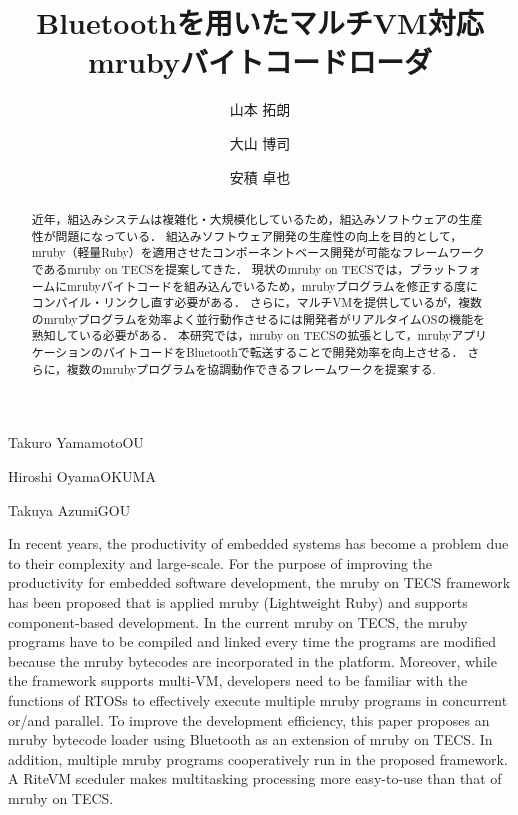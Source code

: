 \documentclass[submit,techrep]{ipsj}
\begin{document}
\title{Bluetoothを用いたマルチVM対応\\mrubyバイトコードローダ}





\author{山本 拓朗}{Takuro Yamamoto}{OU}%
\author{大山 博司}{Hiroshi Oyama}{OKUMA}%
\author{安積 卓也}{Takuya Azumi}{GOU}%

\begin{abstract}
近年，組込みシステムは複雑化・大規模化しているため，組込みソフトウェアの生産性が問題になっている．
組込みソフトウェア開発の生産性の向上を目的として，mruby（軽量Ruby）を適用させたコンポーネントベース開発が可能なフレームワークであるmruby on TECSを提案してきた．
現状のmruby on TECSでは，プラットフォームにmrubyバイトコードを組み込んでいるため，mrubyプログラムを修正する度にコンパイル・リンクし直す必要がある．
さらに，マルチVMを提供しているが，複数のmrubyプログラムを効率よく並行動作させるには開発者がリアルタイムOSの機能を熟知している必要がある．
本研究では，mruby on TECSの拡張として，mrubyアプリケーションのバイトコードをBluetoothで転送することで開発効率を向上させる．
さらに，複数のmrubyプログラムを協調動作できるフレームワークを提案する.

\end{abstract}


\begin{eabstract}
In recent years, the productivity of embedded systems has become a problem due to their complexity and large-scale.
For the purpose of improving the productivity for embedded software development, the mruby on TECS framework has been proposed that is applied mruby (Lightweight Ruby) and supports component-based development.
In the current mruby on TECS, the mruby programs have to be compiled and linked every time the programs are modified because the mruby bytecodes are incorporated in the platform.
Moreover, while the framework supports multi-VM, developers need to be familiar with the functions of RTOSs to effectively execute multiple mruby programs in concurrent or/and parallel.
To improve the development efficiency, this paper proposes an mruby bytecode loader using Bluetooth as an extension of mruby on TECS.
In addition, multiple mruby programs cooperatively run in the proposed framework.
A RiteVM sceduler makes multitasking processing more easy-to-use than that of mruby on TECS.
\end{eabstract}
\end{document}
